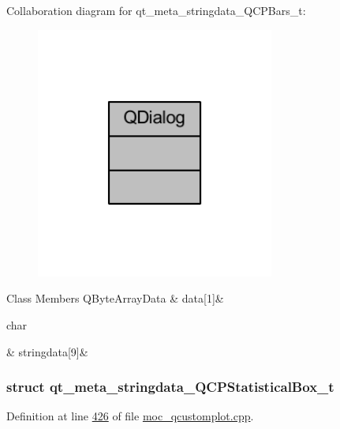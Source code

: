 Collaboration diagram for qt\+\_\+meta\+\_\+stringdata\+\_\+\+Q\+C\+P\+Bars\+\_\+t\+:
\nopagebreak
\begin{figure}[H]
\begin{center}
\leavevmode
\includegraphics[width=222pt]{d6/d82/a00293}
\end{center}
\end{figure}
\begin{DoxyFields}{Class Members}
\hypertarget{a00067_a5237dfd2ea3d5be916ce7c562d734ff4}{Q\+Byte\+Array\+Data}\label{a00067_a5237dfd2ea3d5be916ce7c562d734ff4}
&
data\mbox{[}1\mbox{]}&
\\
\hline

\hypertarget{a00067_a07ece80e538a4239e2a3b6d4b9782407}{char}\label{a00067_a07ece80e538a4239e2a3b6d4b9782407}
&
stringdata\mbox{[}9\mbox{]}&
\\
\hline

\end{DoxyFields}
\label{da/de7/a00210}
\hypertarget{a00067_da/de7/a00210}{}
\subsubsection{struct qt\+\_\+meta\+\_\+stringdata\+\_\+\+Q\+C\+P\+Statistical\+Box\+\_\+t}


Definition at line \hyperlink{a00067_source_l00426}{426} of file \hyperlink{a00067_source}{moc\+\_\+qcustomplot.\+cpp}.



